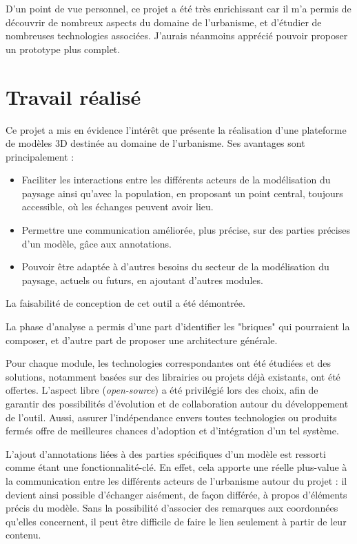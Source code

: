 D'un point de vue personnel, ce projet a été très enrichissant car il m'a permis de découvrir de nombreux aspects du domaine de l'urbanisme, et d'étudier de nombreuses technologies associées. J'aurais néanmoins apprécié pouvoir proposer un prototype plus complet.

\section{Travail réalisé}
Ce projet a mis en évidence l'intérêt que présente la réalisation d'une plateforme de modèles 3D destinée au domaine de l'urbanisme. Ses avantages sont principalement :

\begin{itemize}
    \item Faciliter les interactions entre les différents acteurs de la modélisation du paysage ainsi qu'avec la population, en proposant un point central, toujours accessible, où les échanges peuvent avoir lieu.
    \item Permettre une communication améliorée, plus précise, sur des parties précises d'un modèle, gâce aux annotations.
    \item Pouvoir être adaptée à d'autres besoins du secteur de la modélisation du paysage, actuels ou futurs, en ajoutant d'autres modules.
\end{itemize}

La faisabilité de conception de cet outil a été démontrée.

La phase d'analyse a permis d'une part d'identifier les "briques" qui pourraient la composer, et d'autre part de proposer une architecture générale.

Pour chaque module, les technologies correspondantes ont été étudiées et des solutions, notamment basées sur des librairies ou projets déjà existants, ont été offertes. 
L'aspect libre (\textit{open-source}) a été privilégié lors des choix, afin de garantir des possibilités d'évolution et de collaboration autour du développement de l'outil. Aussi, assurer l'indépendance envers toutes technologies ou produits fermés offre de meilleures chances d'adoption et d'intégration d'un tel système.

L'ajout d'annotations liées à des parties spécifiques d'un modèle est ressorti comme étant une fonctionnalité-clé. 
En effet, cela apporte une réelle plus-value à la communication entre les différents acteurs de l'urbanisme autour du projet : il devient ainsi possible d'échanger aisément, de façon différée, à propos d'éléments précis du modèle. 
Sans la possibilité d'associer des remarques aux coordonnées qu'elles concernent, il peut être difficile de faire le lien seulement à partir de leur contenu.

